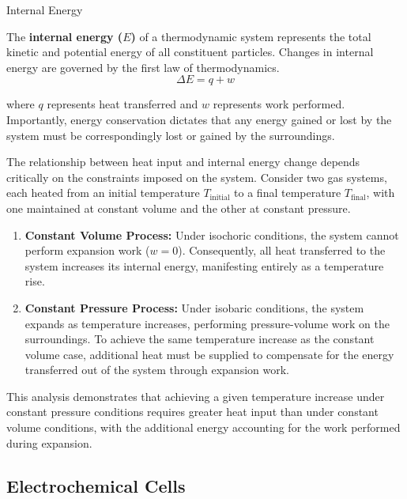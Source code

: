 \documentclass[10pt]{article}
\begin{document}
    \begin{core}{Internal Energy}

      The \textbf{internal energy ($E$)} of a thermodynamic system represents the total kinetic and potential energy of all constituent particles. Changes in internal energy are governed by the first law of thermodynamics.
      \[
        \Delta E = q + w
      \]

      where $q$ represents heat transferred and $w$ represents work performed. Importantly, energy conservation dictates that any energy gained or lost by the system must be correspondingly lost or gained by the surroundings.

      The relationship between heat input and internal energy change depends critically on the constraints imposed on the system. Consider two gas systems, each heated from an initial temperature $T_{\text{initial}}$ to a final temperature $T_{\text{final}}$, with one maintained at constant volume and the other at constant pressure.

      \begin{enumerate}

        \item \textbf{Constant Volume Process:} Under isochoric conditions, the system cannot perform expansion work ($w = 0$). Consequently, all heat transferred to the system increases its internal energy, manifesting entirely as a temperature rise.

        \item \textbf{Constant Pressure Process:} Under isobaric conditions, the system expands as temperature increases, performing pressure-volume work on the surroundings. To achieve the same temperature increase as the constant volume case, additional heat must be supplied to compensate for the energy transferred out of the system through expansion work.

      \end{enumerate}

      This analysis demonstrates that achieving a given temperature increase under constant pressure conditions requires greater heat input than under constant volume conditions, with the additional energy accounting for the work performed during expansion.

    \end{core}

  \subsection{Electrochemical Cells}
\end{document}
